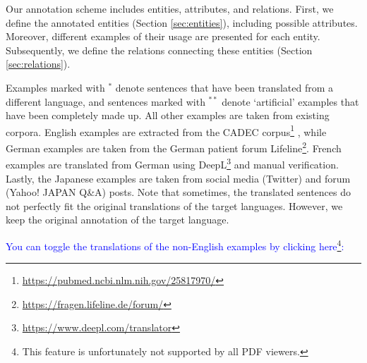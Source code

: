 \documentclass[12pt]{article}
\theoremstyle{definition}
\newcommand{\translated}{$^{\ast}$\xspace}
\newcommand{\madeup}{$^{\ast\ast}$\xspace}
\begin{document}
Our annotation scheme includes entities, attributes, and relations. First, we define the annotated entities (Section \ref{sec:entities}), including possible attributes. Moreover, different examples of their usage are presented for each entity. 
Subsequently, we define the relations connecting these entities (Section \ref{sec:relations}).

Examples marked with \translated denote sentences that have been translated from a different language, and sentences marked with \madeup denote `artificial' examples that have been completely made up. All other examples are taken from existing corpora.
English examples are extracted from the \textsc{CADEC} corpus\footnote{\url{https://pubmed.ncbi.nlm.nih.gov/25817970/}} \citep{karimi_cadec_2015}, while German examples are taken from the German patient forum Lifeline\footnote{\url{https://fragen.lifeline.de/forum/}}.
French examples are translated from German using DeepL\footnote{\url{https://www.deepl.com/translator}} and manual verification.
Lastly, the Japanese examples are taken from social media (Twitter) and forum (Yahoo! JAPAN Q\&A) posts.
Note that sometimes, the translated sentences do not perfectly fit the original translations of the target languages. 
However, we keep the original annotation of the target language.

\begin{center}
\textcolor{blue}{You can toggle the translations of the non-English examples by clicking here\footnote{This feature is unfortunately not supported by all PDF viewers.}:}    
\end{center}

\begin{center}
\begin{tcolorbox}[hbox]
\end{tcolorbox}
\end{center}
\end{document}

